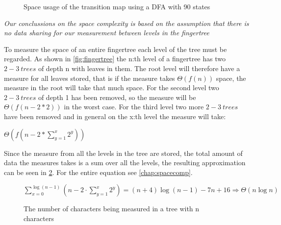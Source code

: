 \begin{figure}[!h]
\caption{Space usage of the transition map using a DFA with 90 states\label{fig:IncSpace}}
\end{figure}

\newpage

\emph{Our conclussions on the space complexity is based on the assumption that
there is no data sharing for our measurement between levels in the fingertree}

To measure the space of an entire fingertree each level of the tree must be
regarded. As shown
in \cref{fig:fingertree} the n:th level of a fingertree has two $2-3~trees$ of
depth n with leaves in them. The root level will therefore have a measure for
all leaves stored, that is if the measure takes $\Theta(f(n))$ space, the
measure in the root will take that much space. For the second level two
$2-3~trees$ of depth 1 has been removed, so the measure will be $\Theta(f(n-2*2))$
in the worst case. For the third level two more $2-3~trees$ have been removed and
in general on the x:th level the measure will take:
\begin{center}$\Theta(f(n-2*\sum\limits_{y=1}^x2^y))$\end{center}
Since the measure from all the levels in
the tree are stored, the total amount of data the measures takes is a sum over
all the levels, the resulting approximation can be seen in \cref{fig:MeaChar}.
For the entire equation see \cref{chap:spacecomp}.

\begin{figure}[!h]
\begin{center}
$\sum\limits_{x=0}^{\log (n-1)}(n- 2 \cdot \sum\limits_{y=1}^x2^y) =
(n+4)\log(n-1) - 7n + 16 \Rightarrow \Theta(n\log n)$
\end{center}
\caption{The number of characters being measured in a tree with n characters\label{fig:MeaChar}}
\end{figure}

